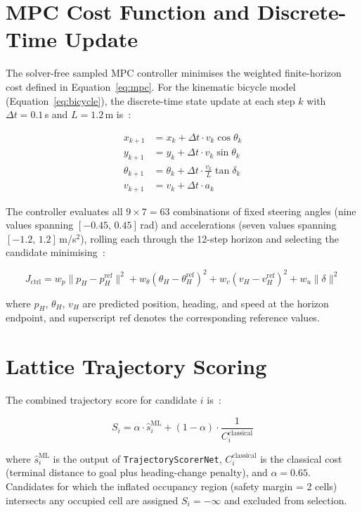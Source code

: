 \documentclass[12pt, a4paper]{article}
\begin{document}
\section{MPC Cost Function and Discrete-Time Update}

The solver-free sampled MPC controller minimises the weighted finite-horizon cost defined
in Equation~\eqref{eq:mpc}. For the kinematic bicycle model (Equation~\eqref{eq:bicycle}),
the discrete-time state update at each step $k$ with $\Delta t\!=\!0.1$\,s and
$L\!=\!1.2$\,m is~\cite{ref234}:

\begin{align}
  x_{k+1} &= x_k + \Delta t \cdot v_k \cos\theta_k \\
  y_{k+1} &= y_k + \Delta t \cdot v_k \sin\theta_k \\
  \theta_{k+1} &= \theta_k + \Delta t \cdot \frac{v_k}{L} \tan\delta_k \\
  v_{k+1} &= v_k + \Delta t \cdot a_k
\end{align}

The controller evaluates all $9\!\times\!7\!=\!63$ combinations of fixed steering angles
(nine values spanning $[-0.45,\,0.45]$\,rad) and accelerations (seven values spanning
$[-1.2,\,1.2]$\,m/s$^2$), rolling each through the 12-step horizon and selecting the
candidate minimising~\cite{ref234}:

\begin{equation}
  J_{\mathrm{ctrl}} = w_p\|p_H - p^{\mathrm{ref}}_H\|^2 + w_\theta(\theta_H - \theta^{\mathrm{ref}}_H)^2
                    + w_v(v_H - v^{\mathrm{ref}}_H)^2 + w_u\|\delta\|^2
\end{equation}

where $p_H$, $\theta_H$, $v_H$ are predicted position, heading, and speed at the horizon
endpoint, and superscript $\mathrm{ref}$ denotes the corresponding reference values.

\section{Lattice Trajectory Scoring}

The combined trajectory score for candidate $i$ is~\cite{ref234}:

\begin{equation}
  S_i = \alpha \cdot \hat{s}_i^{\mathrm{ML}} + (1 - \alpha) \cdot \frac{1}{C_i^{\mathrm{classical}}}
\end{equation}

where $\hat{s}_i^{\mathrm{ML}}$ is the output of \texttt{TrajectoryScorerNet},
$C_i^{\mathrm{classical}}$ is the classical cost (terminal distance to goal plus
heading-change penalty), and $\alpha\!=\!0.65$. Candidates for which the inflated
occupancy region (safety margin = 2 cells) intersects any occupied cell are assigned
$S_i = -\infty$ and excluded from selection.
\end{document}
